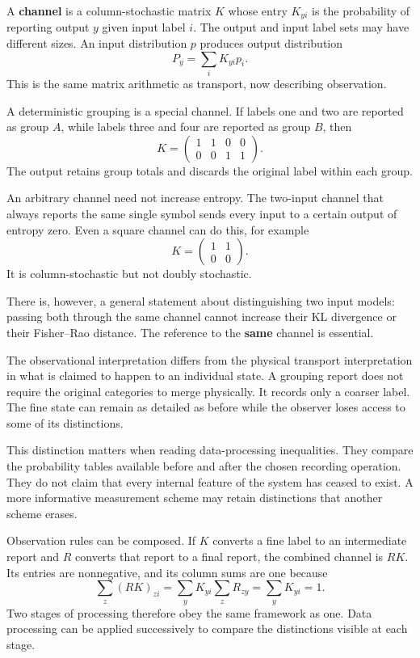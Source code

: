 \documentclass[11pt,oneside,openany]{book}
\theoremstyle{definition}
\theoremstyle{remark}
\numberwithin{equation}{chapter}
\begin{document}
A \textbf{channel} is a column-stochastic matrix \(K\) whose entry \(K_{yi}\) is the probability of reporting output \(y\) given input label \(i\). The output and input label sets may have different sizes. An input distribution \(p\) produces output distribution \[P_y=\sum_iK_{yi}p_i.\] This is the same matrix arithmetic as transport, now describing observation.

A deterministic grouping is a special channel. If labels one and two are reported as group \(A\), while labels three and four are reported as group \(B\), then \[K=\begin{pmatrix}1&1&0&0\\0&0&1&1\end{pmatrix}.\] The output retains group totals and discards the original label within each group.

An arbitrary channel need not increase entropy. The two-input channel that always reports the same single symbol sends every input to a certain output of entropy zero. Even a square channel can do this, for example \[K=\begin{pmatrix}1&1\\0&0\end{pmatrix}.\] It is column-stochastic but not doubly stochastic.

There is, however, a general statement about distinguishing two input models: passing both through the same channel cannot increase their KL divergence or their Fisher--Rao distance. The reference to the \textbf{same} channel is essential.

The observational interpretation differs from the physical transport interpretation in what is claimed to happen to an individual state. A grouping report does not require the original categories to merge physically. It records only a coarser label. The fine state can remain as detailed as before while the observer loses access to some of its distinctions.

This distinction matters when reading data-processing inequalities. They compare the probability tables available before and after the chosen recording operation. They do not claim that every internal feature of the system has ceased to exist. A more informative measurement scheme may retain distinctions that another scheme erases.

Observation rules can be composed. If \(K\) converts a fine label to an intermediate report and \(R\) converts that report to a final report, the combined channel is \(RK\). Its entries are nonnegative, and its column sums are one because \[\sum_z(RK)_{zi}
=\sum_yK_{yi}\sum_zR_{zy}
=\sum_yK_{yi}=1.\] Two stages of processing therefore obey the same framework as one. Data processing can be applied successively to compare the distinctions visible at each stage.
\end{document}
